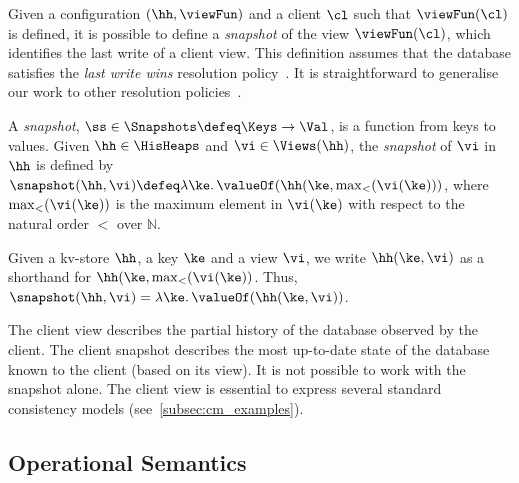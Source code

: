 Given a configuration $(\hh, \viewFun)$ and a client $\cl$ such that $\viewFun(\cl)$ is
defined, it is possible to define a \emph{snapshot} of the
view $\viewFun  (\cl)$, which identifies the last write of a client
view. This definition assumes that the database satisfies the \emph{last write wins}
resolution policy~\cite{}. It  is straightforward to generalise our work
to other resolution policies~\cite{.}.

\begin{definition}[Snapshots]
\label{def:heaps}
\label{def:snapshot}
A \emph{snapshot}, \( \ss \in \Snapshots  \defeq \Keys \to
\Val\),  is a function  from keys to values.
Given $\hh \in \HisHeaps$ and $\vi \in \Views(\hh)$, the \emph{snapshot} of $\vi$ in 
$\hh$ is defined by  $\snapshot(\hh, \vi) \defeq \lambda \ke \ldotp \valueOf(\hh(\ke, \max_{<}(\vi(\ke)))$, 
where $\max_{<}(\vi(\ke))$ is the maximum element in $\vi(\ke)$ with respect to the natural 
order $<$ over $\mathbb{N}$.
\end{definition}
Given a kv-store $\hh$, a key $\ke$ and a view $\vi$, 
we write 
$\hh(\ke, \vi)$ as a shorthand for 
$\hh(\ke, \max_{<}(\vi(\ke))$. Thus, $\snapshot(\hh, \vi) = \lambda \ke \ldotp \valueOf(\hh(\ke, \vi))$. 

\begin{remark}
The client view describes the partial history of the database observed by the client. 
The client snapshot describes the most up-to-date state of the database known to the client (based on its view). 
It is not possible to work with the snapshot alone. 
The client view is essential to express several standard consistency models (see~\cref{subsec:cm_examples}). 
\end{remark}


\subsection{Operational Semantics}

